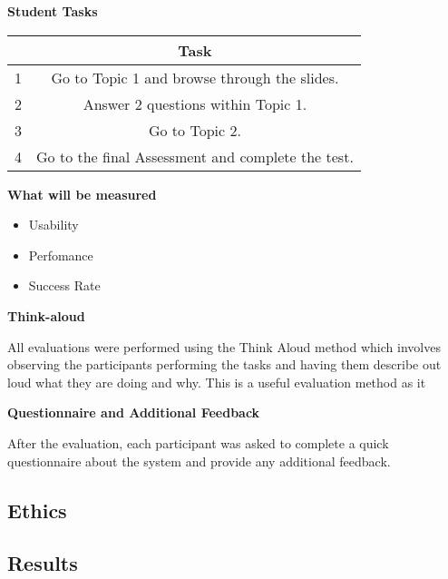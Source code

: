 \documentclass{l3proj}
\begin{document}
\textbf{Student Tasks}

\begin{tabular}{|c|c|}
\hline & \textbf{Task}\\
\hline
\hline 1 &  Go to Topic 1 and browse through the slides.\\
\hline 2 & Answer 2 questions within Topic 1.\\
\hline 3 & Go to Topic 2.\\
\hline 4 & Go to the final Assessment and complete the test.\\
\hline
\end{tabular}


\textbf{What will be measured}

\begin{itemize}
\item Usability
\item Perfomance
\item Success Rate
\end{itemize}

\textbf{Think-aloud}

All evaluations were performed using the Think Aloud method which involves observing the participants performing the tasks and having them describe out loud what they are doing and why. This is a useful evaluation method as it


\textbf{Questionnaire and Additional Feedback}

After the evaluation, each participant was asked to complete a quick questionnaire about the system and provide any additional feedback. 

\subsection{Ethics}

\subsection{Results}
\end{document}
